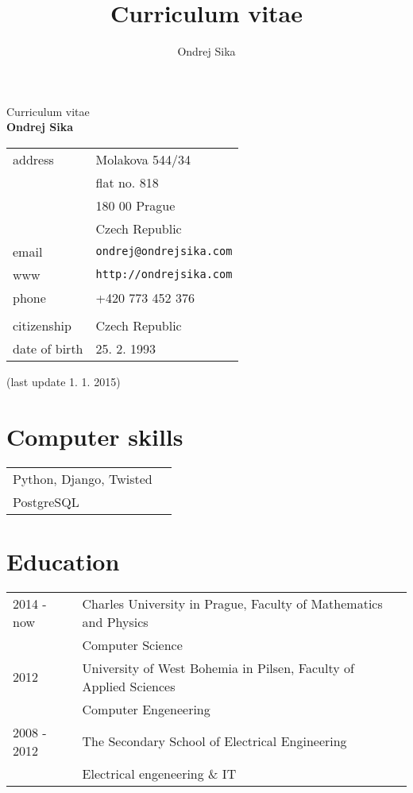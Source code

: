 \documentclass[12pt,a4paper]{article}
\title{Curriculum vitae}
\author{Ondrej Sika}
\begin{document}
\begin{center}
{\Large Curriculum vitae}\\
\vspace*{1cm}
{\LARGE \bf Ondrej Sika}\\
\vspace*{0.2cm}
\begin{tabular}{R{5cm}L{5cm}}
address & Molakova 544/34\\
 & flat no. 818\\
 & 180 00 Prague\\
 & Czech Republic\\
email & \texttt{ondrej@ondrejsika.com}\\
www & \texttt{http://ondrejsika.com}\\
phone & +420 773 452 376\\
\\
citizenship & Czech Republic\\
date of birth & 25. 2. 1993\\
\end{tabular}

\vspace*{0.2cm}
{\small (last update 1. 1. 2015)}
\end{center}

\section*{Computer skills}
\begin{tabular}{@{}ll}
Python, Django, Twisted & \\
PostgreSQL & \\
\end{tabular}

\section*{Education}
\begin{tabular}{@{}p{2cm}l}
2014 - now & Charles University in Prague, Faculty of Mathematics and Physics\\
 & Computer Science\\
2012  & University of West Bohemia in Pilsen, Faculty of Applied Sciences\\
 & Computer Engeneering\\
2008 - 2012 & The Secondary School of Electrical Engineering\\
 & Electrical engeneering \& IT\\
\end{tabular}
\end{document}
